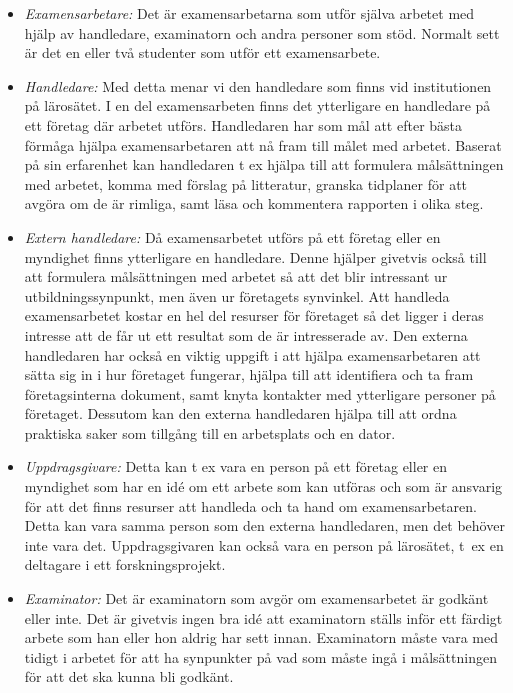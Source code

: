 \begin{itemize}
\item
  \emph{Examensarbetare:} Det är examensarbetarna som utför själva
  arbetet med hjälp av handledare, examinatorn och andra personer som
  stöd. Normalt sett är det en eller två studenter som utför ett
  examensarbete.
\item
  \emph{Handledare:} Med detta menar vi den handledare som finns vid
  institutionen på lärosätet. I en del examensarbeten finns det
  ytterligare en handledare på ett företag där arbetet utförs.
  Handledaren har som mål att efter bästa förmåga hjälpa
  examensarbetaren att nå fram till målet med arbetet. Baserat på sin
  erfarenhet kan handledaren t ex hjälpa till att formulera
  målsättningen med arbetet, komma med förslag på litteratur, granska
  tidplaner för att avgöra om de är rimliga, samt läsa och kommentera
  rapporten i olika steg.
\item
  \emph{Extern handledare:} Då examensarbetet utförs på ett företag
  eller en myndighet finns ytterligare en handledare. Denne hjälper
  givetvis också till att formulera målsättningen med arbetet så att det
  blir intressant ur utbildningssynpunkt, men även ur företagets
  synvinkel. Att handleda examensarbetet kostar en hel del resurser för
  företaget så det ligger i deras intresse att de får ut ett resultat
  som de är intresserade av. Den externa handledaren har också en viktig
  uppgift i att hjälpa examensarbetaren att sätta sig in i hur företaget
  fungerar, hjälpa till att identifiera och ta fram företagsinterna
  dokument, samt knyta kontakter med ytterligare personer på företaget.
  Dessutom kan den externa handledaren hjälpa till att ordna praktiska
  saker som tillgång till en arbetsplats och en dator.
\item
  \emph{Uppdragsgivare:} Detta kan t ex vara en person på ett företag
  eller en myndighet som har en idé om ett arbete som kan utföras och
  som är ansvarig för att det finns resurser att handleda och ta hand om
  examensarbetaren. Detta kan vara samma person som den externa
  handledaren, men det behöver inte vara det. Uppdragsgivaren kan också
  vara en person på lärosätet, t~ex en deltagare i ett
  forskningsprojekt.
\item
  \emph{Examinator:} Det är examinatorn som avgör om examensarbetet är
  godkänt eller inte. Det är givetvis ingen bra idé att examinatorn
  ställs inför ett färdigt arbete som han eller hon aldrig har sett
  innan. Examinatorn måste vara med tidigt i arbetet för att ha
  synpunkter på vad som måste ingå i målsättningen för att det ska kunna
  bli godkänt.
\end{itemize}

